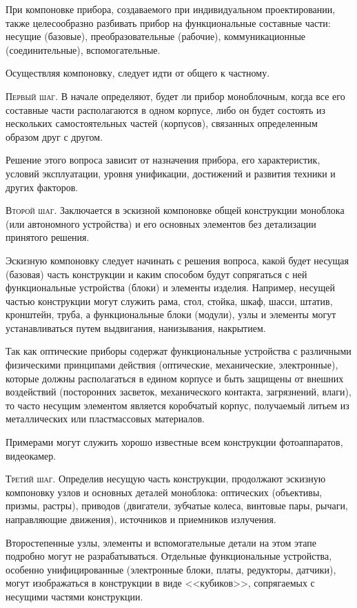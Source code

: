 При компоновке прибора, создаваемого при индивидуальном проектировании, также целесообразно разбивать прибор на функциональные составные части: несущие (базовые), преобразовательные (рабочие), коммуникационные (соединительные), вспомогательные.

Осуществляя компоновку, следует идти от общего к частному.

\textsc{Первый шаг.} В начале определяют, будет ли прибор моноблочным, когда все его составные части располагаются в одном корпусе, либо он будет состоять из нескольких самостоятельных частей (корпусов), связанных определенным образом друг с другом.

Решение этого вопроса зависит от назначения прибора, его характеристик, условий эксплуатации, уровня унификации, достижений и развития техники и других факторов.

\textsc{Второй шаг.} Заключается в эскизной компоновке общей конструкции моноблока (или автономного устройства) и его основных элементов без детализации принятого решения.

Эскизную компоновку следует начинать с решения вопроса, какой будет несущая (базовая) часть конструкции и каким способом будут сопрягаться с ней функциональные устройства (блоки) и элементы изделия. Например, несущей частью конструкции могут служить рама, стол, стойка, шкаф, шасси, штатив, кронштейн, труба, а функциональные блоки (модули), узлы и элементы могут устанавливаться путем выдвигания, нанизывания, накрытием.

Так как оптические приборы содержат функциональные устройства с различными физическими принципами действия (оптические, механические, электронные), которые должны располагаться в едином корпусе и быть защищены от внешних воздействий (посторонних засветок, механического контакта, загрязнений, влаги), то часто несущим элементом является коробчатый корпус, получаемый литьем из металлических или пластмассовых материалов.

Примерами могут служить хорошо известные всем конструкции фотоаппаратов, видеокамер.

\textsc{Третий шаг.} Определив несущую часть конструкции, продолжают эскизную компоновку узлов и основных деталей моноблока: оптических (объективы, призмы, растры), приводов (двигатели, зубчатые колеса, винтовые пары, рычаги, направляющие движения), источников и приемников излучения.

Второстепенные узлы, элементы и вспомогательные детали на этом этапе подробно могут не разрабатываться. Отдельные функциональные устройства, особенно унифицированные (электронные блоки, платы, редукторы, датчики), могут изображаться в конструкции в виде <<кубиков>>, сопрягаемых с несущими частями конструкции.

